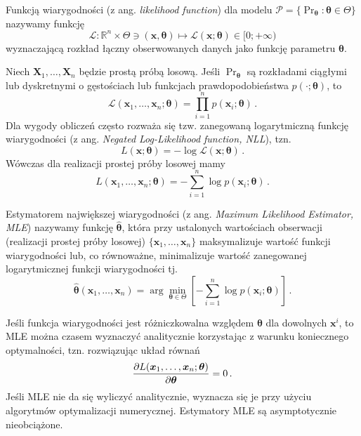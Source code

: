 \documentclass{myclass}
\numberwithin{equation}{subsection}
\begin{document}
\begin{definition}
Funkcją wiarygodności (z ang. \textit{likelihood function}) dla modelu \(\mathcal{P} =
\{\Pr_{\bm{\theta}} : \bm{\theta} \in \Theta\}\) nazywamy funkcję
\begin{equation*}
    \mathcal{L}: \mathbb{R}^n \times \Theta \ni (\bm{x},\bm{\theta}) \mapsto \mathcal{L}(\bm{x};\bm{\theta}) \in [0; +\infty)
\end{equation*}
wyznaczającą rozkład łączny obserwowanych danych jako funkcję parametru \(\bm{\theta}\).    
\end{definition}
Niech \(\bm{X}_1,\ldots,\bm{X}_n\) będzie prostą próbą losową. Jeśli \(\Pr_{\bm{\theta}}\) są
rozkładami ciągłymi lub dyskretnymi o gęstościach lub funkcjach prawdopodobieństwa
\(p(\cdot;\bm{\theta})\), to
\begin{equation}
    \mathcal{L}(\bm{x}_1,\ldots,\bm{x}_n;\bm{\theta}) = \prod_{i=1}^n p(\bm{x}_i;\bm{\theta})\,.
\end{equation}
Dla wygody obliczeń często rozważa się tzw. zanegowaną logarytmiczną funkcję wiarygodności (z ang.
\textit{Negated Log-Likelihood function, NLL}), tzn.
\begin{equation}
    L(\bm{x};\bm{\theta}) = - \log \mathcal{L}(\bm{x};\bm{\theta})\,.
\end{equation}
Wówczas dla realizacji prostej próby losowej mamy
\begin{equation}
    L(\bm{x}_1,\ldots,\bm{x}_n;\bm{\theta}) = -\sum_{i=1}^n \log p(\bm{x}_i;\bm{\theta})\,.
\end{equation}

\begin{definition}
Estymatorem największej wiarygodności (z ang. \textit{Maximum Likelihood Estimator, MLE}) nazywamy
funkcję \(\bm{\hat{\theta}}\), która przy ustalonych wartościach obserwacji (realizacji prostej
próby losowej) \(\{\bm{x}_1,\ldots,\bm{x}_n\}\) maksymalizuje wartość funkcji wiarygodności lub, co
równoważne, minimalizuje wartość zanegowanej logarytmicznej funkcji wiarygodności tj.
\begin{equation*}
    \bm{\hat \theta}(\bm{x}_1,\ldots,\bm{x}_n) = \arg \min_{\bm{\theta} \in \Theta} \left[- \sum_{i=1}^n \log p(\bm{x}_i ; \bm{\theta})\right]\,.
\end{equation*}
\end{definition}
    
Jeśli funkcja wiarygodności jest różniczkowalna względem \(\bm{\theta}\) dla dowolnych \(\bm{x}^i\),
to MLE można czasem wyznaczyć analitycznie korzystając z warunku koniecznego optymalności, tzn.
rozwiązując układ równań
\begin{equation}
    \pdv{L(\bm{x}_1,\ldots,\bm{x}_n; \bm{\theta})}{\bm{\theta}} = 0\,.
\end{equation}
Jeśli MLE nie da się wyliczyć analitycznie, wyznacza się je przy użyciu algorytmów optymalizacji
numerycznej. Estymatory MLE są asymptotycznie nieobciążone.
\end{document}

